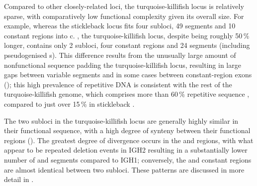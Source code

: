 Compared to other closely-related loci, the turquoise-killifish locus is relatively sparse, with comparatively low functional complexity given its overall size. For example, whereas the stickleback locus fits four subloci, 49 \vh segments and 10 constant regions into c.  \parencite{bao2010stickleback,gambondeza2011stickleback}, the turquoise-killifish locus, despite being roughly 50\,\% longer, contains only 2 subloci, four constant regions and 24 \vh segments (including pseudogenised \vh{}s). This difference results from the unusually large amount of nonfunctional sequence padding the turquoise-killifish locus, resulting in large gaps between variable segments and in some cases between constant-region exons (); this high prevalence of repetitive DNA is consistent with the rest of the turquoise-killifish genome, which comprises more than 60\,\% repetitive sequence \parencite{willemsen2019popgen}, compared to just over 15\,\% in stickleback \parencite{yuan2018repeats}.
	
The two subloci in the turquoise-killifish locus are generally highly similar in their functional sequence, with a high degree of synteny between their functional regions (). The greatest degree of divergence occurs in the \vh and \dh regions, with what appear to be repeated deletion events in IGH2 resulting in a substantially lower number of \vh and \dh segments compared to IGH1; conversely, the \jh and constant regions are almost identical between two subloci. These patterns are discussed in more detail in .
	
